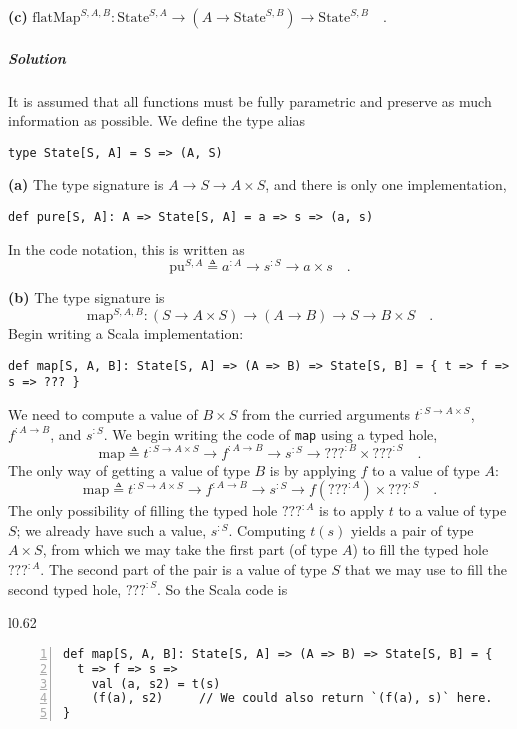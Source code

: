 \textbf{(c)} $\text{flatMap}^{S,A,B}:\text{State}^{S,A}\rightarrow(A\rightarrow\text{State}^{S,B})\rightarrow\text{State}^{S,B}\quad.$

\subparagraph{Solution}

It is assumed that all functions must be fully parametric and preserve
as much information as possible. We define the type alias
\begin{lstlisting}
type State[S, A] = S => (A, S)
\end{lstlisting}

\textbf{(a)} The type signature is $A\rightarrow S\rightarrow A\times S$,
and there is only one implementation,
\begin{lstlisting}
def pure[S, A]: A => State[S, A] = a => s => (a, s)
\end{lstlisting}
In the code notation, this is written as
\[
\text{pu}^{S,A}\triangleq a^{:A}\rightarrow s^{:S}\rightarrow a\times s\quad.
\]

\textbf{(b)} The type signature is 
\[
\text{map}^{S,A,B}:(S\rightarrow A\times S)\rightarrow(A\rightarrow B)\rightarrow S\rightarrow B\times S\quad.
\]
Begin writing a Scala implementation:
\begin{lstlisting}
def map[S, A, B]: State[S, A] => (A => B) => State[S, B] = { t => f => s => ??? }
\end{lstlisting}
We need to compute a value of $B\times S$ from the curried arguments
$t^{:S\rightarrow A\times S}$, $f^{:A\rightarrow B}$, and $s^{:S}$.
We begin writing the code of \lstinline!map! using a typed hole,
\[
\text{map}\triangleq t^{:S\rightarrow A\times S}\rightarrow f^{:A\rightarrow B}\rightarrow s^{:S}\rightarrow\text{???}^{:B}\times\text{???}^{:S}\quad.
\]
The only way of getting a value of type $B$ is by applying $f$ to
a value of type $A$:
\[
\text{map}\triangleq t^{:S\rightarrow A\times S}\rightarrow f^{:A\rightarrow B}\rightarrow s^{:S}\rightarrow f(\text{???}^{:A})\times\text{???}^{:S}\quad.
\]
The only possibility of filling the typed hole $\text{???}^{:A}$
is to apply $t$ to a value of type $S$; we already have such a value,
$s^{:S}$. Computing $t(s)$ yields a pair of type $A\times S$, from
which we may take the first part (of type $A$) to fill the typed
hole $\text{???}^{:A}$. The second part of the pair is a value of
type $S$ that we may use to fill the second typed hole, $\text{???}^{:S}$.
So the Scala code is

\begin{wrapfigure}{l}{0.62\columnwidth}%
\vspace{-0.8\baselineskip}
\begin{lstlisting}[numbers=left]
def map[S, A, B]: State[S, A] => (A => B) => State[S, B] = {
  t => f => s =>
    val (a, s2) = t(s)
    (f(a), s2)     // We could also return `(f(a), s)` here.
}
\end{lstlisting}
\vspace{-1.25\baselineskip}
\end{wrapfigure}%

